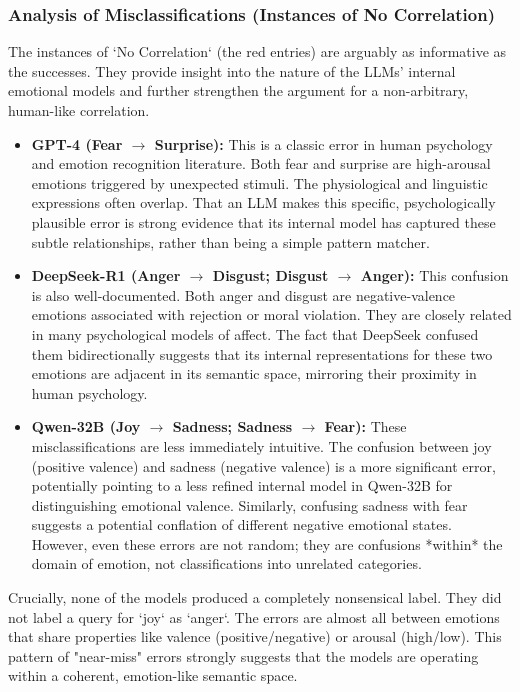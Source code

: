 \subsubsection{Analysis of Misclassifications (Instances of No Correlation)}
The instances of `No Correlation` (the red entries) are arguably as informative as the successes. They provide insight into the nature of the LLMs' internal emotional models and further strengthen the argument for a non-arbitrary, human-like correlation.
\begin{itemize}
    \item \textbf{GPT-4 (Fear $\rightarrow$ Surprise):} This is a classic error in human psychology and emotion recognition literature. Both fear and surprise are high-arousal emotions triggered by unexpected stimuli. The physiological and linguistic expressions often overlap. That an LLM makes this specific, psychologically plausible error is strong evidence that its internal model has captured these subtle relationships, rather than being a simple pattern matcher.
    \item \textbf{DeepSeek-R1 (Anger $\rightarrow$ Disgust; Disgust $\rightarrow$ Anger):} This confusion is also well-documented. Both anger and disgust are negative-valence emotions associated with rejection or moral violation. They are closely related in many psychological models of affect. The fact that DeepSeek confused them bidirectionally suggests that its internal representations for these two emotions are adjacent in its semantic space, mirroring their proximity in human psychology.
    \item \textbf{Qwen-32B (Joy $\rightarrow$ Sadness; Sadness $\rightarrow$ Fear):} These misclassifications are less immediately intuitive. The confusion between joy (positive valence) and sadness (negative valence) is a more significant error, potentially pointing to a less refined internal model in Qwen-32B for distinguishing emotional valence. Similarly, confusing sadness with fear suggests a potential conflation of different negative emotional states. However, even these errors are not random; they are confusions *within* the domain of emotion, not classifications into unrelated categories.
\end{itemize}
Crucially, none of the models produced a completely nonsensical label. They did not label a query for `joy` as `anger`. The errors are almost all between emotions that share properties like valence (positive/negative) or arousal (high/low). This pattern of "near-miss" errors strongly suggests that the models are operating within a coherent, emotion-like semantic space.

